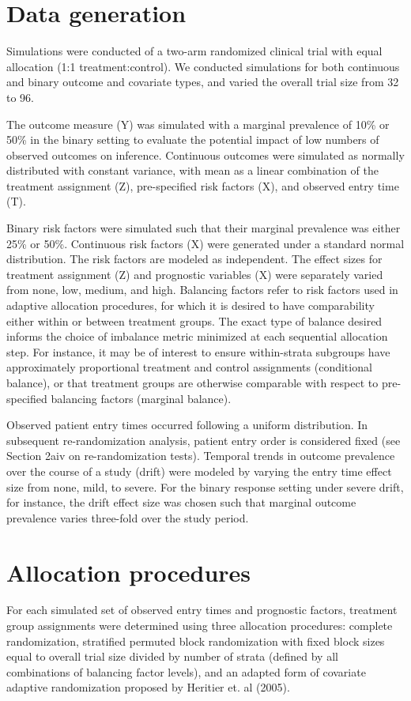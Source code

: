 \section{Data generation}
Simulations were conducted of a two-arm randomized clinical trial with equal allocation (1:1 treatment:control).  
We conducted simulations for both continuous and binary outcome and covariate types, and varied the overall trial size from 32 to 96.

The outcome measure (Y) was simulated with a marginal prevalence of 10\% or 50\% in the binary setting to evaluate the potential impact of low numbers of observed outcomes on inference.  
Continuous outcomes were simulated as normally distributed with constant variance, with mean as a linear combination of the treatment assignment (Z), pre-specified risk factors (X), and observed entry time (T).

Binary risk factors were simulated such that their marginal prevalence was either 25\% or 50\%.  
Continuous risk factors (X) were generated under a standard normal distribution.  
The risk factors are modeled as independent.  
The effect sizes for treatment assignment (Z) and prognostic variables (X) were separately varied from none, low, medium, and high.  
Balancing factors refer to risk factors used in adaptive allocation procedures, for which it is desired to have comparability either within or between treatment groups.  
The exact type of balance desired informs the choice of imbalance metric minimized at each sequential allocation step.  
For instance, it may be of interest to ensure within-strata subgroups have approximately proportional treatment and control assignments (conditional balance), or that treatment groups are otherwise comparable with respect to pre-specified balancing factors (marginal balance). 

Observed patient entry times occurred following a uniform distribution.  
In subsequent re-randomization analysis, patient entry order is considered fixed (see Section 2aiv on re-randomization tests).  %
Temporal trends in outcome prevalence over the course of a study (drift) were modeled by varying the entry time effect size from none, mild, to severe. 
For the binary response setting under severe drift, for instance, the drift effect size was chosen such that marginal outcome prevalence varies three-fold over the study period.

\section{Allocation procedures}
For each simulated set of observed entry times and prognostic factors, treatment group assignments were determined using three allocation procedures: complete randomization, stratified permuted block randomization with fixed block sizes equal to overall trial size divided by number of strata (defined by all combinations of balancing factor levels), and an adapted form of covariate adaptive randomization proposed by Heritier et. al (2005). 

